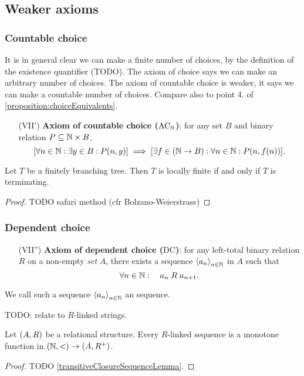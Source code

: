 \subsection{Weaker axioms}
\subsubsection{Countable choice}
It is in general clear we can make a finite number of choices, by the definition of the existence quantifier (TODO). The axiom of choice says we can make an arbitrary number of choices. The axiom of countable choice is weaker, it says we can make a countable number of choices. Compare also to point 4. of \ref{proposition:choiceEquivalents}.
\begin{enumerate}[(I)]
\setcounter{enumi}{6}
\item[(VII')] \textbf{Axiom of countable choice ($\text{AC}_{\mathbb{N}}$)}: for any set $B$ and binary relation $P\subseteq \mathbb{N}\times B$,
\[ [\forall n\in \mathbb{N}: \exists y\in B: P(n,y)] \implies [\exists f\in (\mathbb{N}\to B): \forall n \in \mathbb{N}: P(n,f(n))]. \]
\end{enumerate}

\begin{theorem}
Let $T$ be a finitely branching tree. Then $T$ is locally finite \textup{if and only if} $T$ is terminating.
\end{theorem}
\begin{proof}
TODO safari method (cfr Bolzano-Weierstrass)
\end{proof}

\subsubsection{Dependent choice}
\begin{enumerate}[(I)]
\setcounter{enumi}{6}
\item[(VII'')] \textbf{Axiom of dependent choice ($\text{DC}$)}: for any left-total binary relation $R$ on a non-empty \emph{set} $A$, there exists a sequence $\left\langle a_n \right\rangle_{n\in \mathbb{N}}$ in $A$ such that
\[ \forall n\in \mathbb{N}: \quad a_n\mathrel{R}a_{n+1}. \]
\end{enumerate}

\begin{definition}
We call such a sequence $\left\langle a_n \right\rangle_{n\in \mathbb{N}}$ an  sequence.
\end{definition}

TODO: relate to $R$-linked strings.

\begin{lemma} \label{choiceSequenceMonotone}
Let $\sSet{A, R}$ be a relational structure. Every $R$-linked sequence is a monotone function in $\sSet{\N, <} \to \sSet{A, R^+}$.
\end{lemma}
\begin{proof}
TODO \ref{transitiveClosureSequenceLemma}.
\end{proof}

